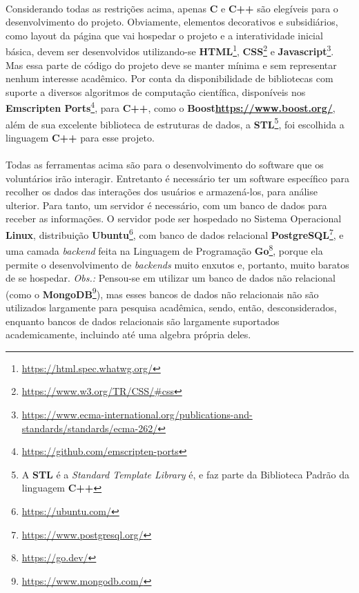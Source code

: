 \documentclass{article}
\begin{document}
	\paragraph{}
	Considerando todas as restrições acima, apenas \textbf{C} e \textbf{C++} são elegíveis para o desenvolvimento do projeto. Obviamente, elementos decorativos e subsidiários, como layout da página que vai hospedar o projeto e a interatividade inicial básica, devem ser desenvolvidos utilizando-se \textbf{HTML}\footnote{\url{https://html.spec.whatwg.org/}}, \textbf{CSS}\footnote{\url{https://www.w3.org/TR/CSS/\#css}} e \textbf{Javascript}\footnote{\url{https://www.ecma-international.org/publications-and-standards/standards/ecma-262/}}. Mas essa parte de código do projeto deve se manter mínima e sem representar nenhum interesse acadêmico. Por conta da disponibilidade de bibliotecas com suporte a diversos algoritmos de computação científica, disponíveis nos \textbf{Emscripten Ports}\footnote{\url{https://github.com/emscripten-ports}}, para \textbf{C++}, como o \textbf{Boost}\textbf{\url{https://www.boost.org/}}, além de sua excelente biblioteca de estruturas de dados, a \textbf{STL}\footnote{A \textbf{STL} é a \textit{Standard Template Library} é, e faz parte da Biblioteca Padrão da linguagem \textbf{C++}}, foi escolhida a linguagem \textbf{C++} para esse projeto.
	
	\paragraph{}
	Todas as ferramentas acima são para o desenvolvimento do software que os voluntários irão interagir. Entretanto é necessário ter um software específico para recolher os dados das interações dos usuários e armazená-los, para análise ulterior. Para tanto, um servidor é necessário, com um banco de dados para receber as informações. O servidor pode ser hospedado no Sistema Operacional \textbf{Linux}\textregistered, distribuição \textbf{Ubuntu}\texttrademark\footnote{\url{https://ubuntu.com/}}, com banco de dados relacional \textbf{PostgreSQL}\footnote{\url{https://www.postgresql.org/}}, e uma camada \textit{backend} feita na Linguagem de Programação \textbf{Go}\footnote{\url{https://go.dev/}}, porque ela permite o desenvolvimento de \textit{backends} muito enxutos e, portanto, muito baratos de se hospedar. \textit{Obs.:} Pensou-se em utilizar um banco de dados não relacional (como o \textbf{MongoDB}\footnote{\url{https://www.mongodb.com/}}), mas esses bancos de dados não relacionais não são utilizados largamente para pesquisa acadêmica, sendo, então, desconsiderados, enquanto bancos de dados relacionais são largamente suportados academicamente, incluindo até uma algebra própria deles.
	
\end{document}
